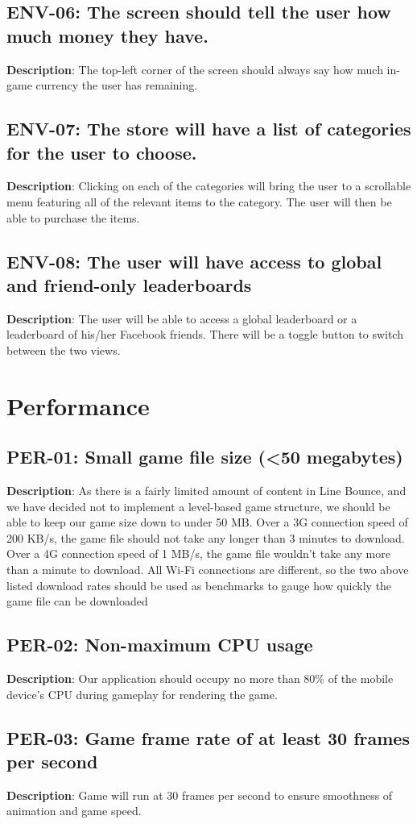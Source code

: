 \subsection{ENV-06: The screen should tell the user how much money they have.}
\textbf{Description}: The top-left corner of the screen should always say how
much in-game currency the user has remaining.
\subsection{ENV-07: The store will have a list of categories for the user to
choose. }
\textbf{Description}: Clicking on each of the categories will bring the user
to a scrollable menu featuring all of the relevant items to the category.
The user will then be able to purchase the items. 
\subsection{ENV-08: The user will have access to global and friend-only leaderboards}
\textbf{Description}: The user will be able to access a global leaderboard
or a leaderboard of his/her Facebook friends. There will be a toggle
button to switch between the two views.
\section{Performance}
\subsection{PER-01: Small game file size (<50 megabytes)}
\textbf{Description}: As there is a fairly limited amount of content in Line
Bounce, and we have decided not to implement a level-based game structure,
we should be able to keep our game size down to under 50 MB. Over
a 3G connection speed of 200 KB/s, the game file should not take any
longer than 3 minutes to download. Over a 4G connection speed of 1
MB/s, the game file wouldn\textquoteright{}t take any more than a
minute to download. All Wi-Fi connections are different, so the two
above listed download rates should be used as benchmarks to gauge
how quickly the game file can be downloaded
\subsection{PER-02: Non-maximum CPU usage}
\textbf{Description}: Our application should occupy no more than 80\% of the
mobile device\textquoteright{}s CPU during gameplay for rendering
the game. 
\subsection{PER-03: Game frame rate of at least 30 frames per second}
\textbf{Description}: Game will run at 30 frames per second to ensure smoothness
of animation and game speed.
